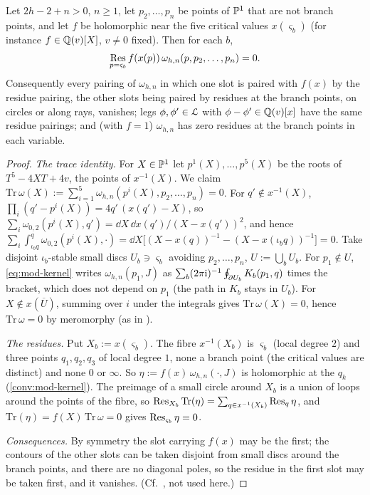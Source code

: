 \begin{lem}
\label{lem:mod-xfun}
Let $2h-2+n>0$, $n\geq 1$, let $p_2,\dots,p_n$ be points of $\mathbb{P}^1$ that are not branch points, and let $f$ be holomorphic near the five critical values $x(\varsigma_b)$ (for instance $f\in\mathbb{Q}(v)[X]$, $v\neq 0$ fixed). Then for each $b$,
\[
\operatorname*{Res}_{p=\varsigma_b}f(x(p))\,\omega_{h,n}(p,p_2,\dots,p_n)=0 .
\]
Consequently every pairing of $\omega_{h,n}$ in which one slot is paired with $f(x)$ by the residue pairing, the other slots being paired by residues at the branch points, on circles or along rays, vanishes; legs $\phi,\phi'\in\mathcal{L}$ with $\phi-\phi'\in\mathbb{Q}(v)[x]$ have the same residue pairings; and (with $f=1$) $\omega_{h,n}$ has zero residues at the branch points in each variable.
\end{lem}

\begin{proof}
\emph{The trace identity.} For $X\in\mathbb{P}^1$ let $p^1(X),\dots,p^5(X)$ be the roots of $T^5-4XT+4v$, the points of $x^{-1}(X)$. We claim $\mathrm{Tr}\,\omega(X):=\sum_{i=1}^5\omega_{h,n}(p^i(X),p_2,\dots,p_n)=0$. For $q'\notin x^{-1}(X)$, $\prod_i(q'-p^i(X))=4q'\,(x(q')-X)$, so $\sum_i\omega_{0,2}(p^i(X),q')=\dd X\,\dd x(q')/(X-x(q'))^2$, and hence $\sum_i\int_{\iota_bq}^q\omega_{0,2}(p^i(X),\cdot)=\dd X\big[(X-x(q))^{-1}-(X-x(\iota_bq))^{-1}\big]=0$. Take disjoint $\iota_b$-stable small discs $U_b\ni\varsigma_b$ avoiding $p_2,\dots,p_n$, $U:=\bigcup_bU_b$. For $p_1\notin U$, \eqref{eq:mod-kernel} writes $\omega_{h,n}(p_1,J)$ as $\sum_b(2\pi\mathrm{i})^{-1}\oint_{\partial U_b}K_b(p_1,q)$ times the bracket, which does not depend on $p_1$ (the path in $K_b$ stays in $U_b$). For $X\notin x(\overline U)$, summing over $i$ under the integrals gives $\mathrm{Tr}\,\omega(X)=0$, hence $\mathrm{Tr}\,\omega=0$ by meromorphy (as in \cite[App.~A, (A-1), (A-5)]{Eynard:2007kz}).

\emph{The residues.} Put $X_b:=x(\varsigma_b)$. The fibre $x^{-1}(X_b)$ is $\varsigma_b$ (local degree $2$) and three points $q_1,q_2,q_3$ of local degree $1$, none a branch point (the critical values are distinct) and none $0$ or $\infty$. So $\eta:=f(x)\,\omega_{h,n}(\cdot,J)$ is holomorphic at the $q_k$ (\cref{conv:mod-kernel}). The preimage of a small circle around $X_b$ is a union of loops around the points of the fibre, so $\operatorname*{Res}_{X_b}\mathrm{Tr}(\eta)=\sum_{q\in x^{-1}(X_b)}\operatorname*{Res}_q\eta$, and $\mathrm{Tr}(\eta)=f(X)\,\mathrm{Tr}\,\omega=0$ gives $\operatorname*{Res}_{\varsigma_b}\eta=0$.

\emph{Consequences.} By symmetry the slot carrying $f(x)$ may be the first; the contours of the other slots can be taken disjoint from small discs around the branch points, and there are no diagonal poles, so the residue in the first slot may be taken first, and it vanishes. (Cf.\ \cite[Thm.~4.4 (4-23), Cor.~4.1 (4-26)--(4-29), App.~A (A-25)]{Eynard:2007kz}, not used here.)
\end{proof}

